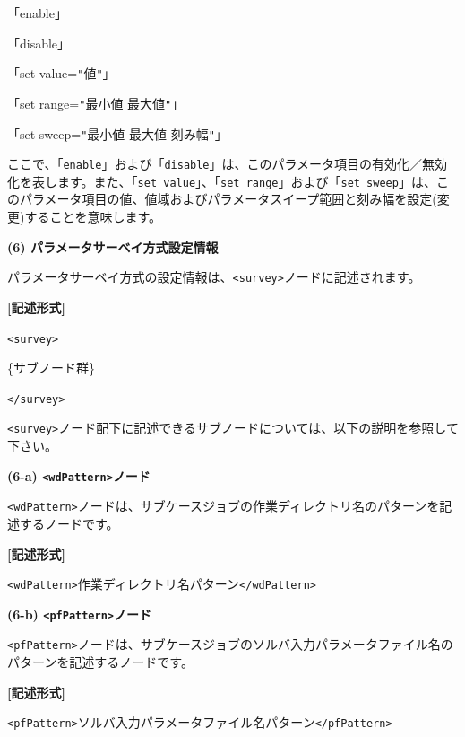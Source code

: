 \documentclass[a4paper,11pt]{jarticle}
\begin{document}
{\leftskip=10pt
\begin{tt}
「enable」

「disable」

「set value=\texttt{"}値\texttt{"}」

「set range=\texttt{"}最小値  最大値\texttt{"}」

「set sweep=\texttt{"}最小値  最大値  刻み幅\texttt{"}」
\end{tt}
\leftskip=0pt
ここで、「{\tt enable}」および「{\tt disable}」は、このパラメータ項目の有効化／無効化を表します。また、「{\tt set value}」、「{\tt set range}」および「{\tt set sweep}」は、このパラメータ項目の値、値域およびパラメータスイープ範囲と刻み幅を設定(変更)することを意味します。

\vspace{12pt}
\textbf{(6) パラメータサーベイ方式設定情報}

パラメータサーベイ方式の設定情報は、\texttt{<survey>}ノードに記述されます。

\vspace{8pt}
\leftskip=12pt
\textbf{[記述形式]}

\leftskip=42pt
\texttt{<survey>}    

\parindent=14pt
\{サブノード群\}

\parindent=0pt
\texttt{</survey>}

\vspace{8pt}
\leftskip=0pt
\texttt{<survey>}ノード配下に記述できるサブノードについては、以下の説明を参照して下さい。

\vspace{12pt}
\textbf{(6-a) \texttt{<wdPattern>}ノード}

\texttt{<wdPattern>}ノードは、サブケースジョブの作業ディレクトリ名のパターンを記述するノードです。

\vspace{8pt}
\leftskip=12pt
\textbf{[記述形式]}

\leftskip=42pt
\texttt{<wdPattern>}作業ディレクトリ名パターン\texttt{</wdPattern>}

\vspace{12pt}
\leftskip=0pt
\textbf{(6-b) \texttt{<pfPattern>}ノード}

\texttt{<pfPattern>}ノードは、サブケースジョブのソルバ入力パラメータファイル名のパターンを記述するノードです。

\vspace{8pt}
\leftskip=12pt
\textbf{[記述形式]}

\leftskip=42pt
\texttt{<pfPattern>}ソルバ入力パラメータファイル名パターン\texttt{</pfPattern>}

}
\end{document}
